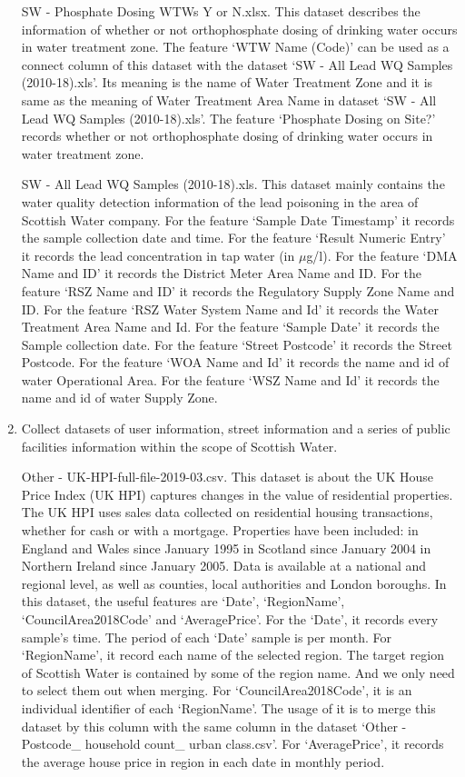 \documentclass[11pt,twoside]{article}
\numberwithin{Theorem}{section}
\numberwithin{Definition}{section}
\numberwithin{Lemma}{section}
\numberwithin{Algorithm}{section}
\numberwithin{equation}{section}
\begin{document}
\begin{enumerate}
SW - Phosphate Dosing WTWs Y or N.xlsx. This dataset describes the information of whether or not orthophosphate dosing of drinking water occurs in water treatment zone. The feature `WTW Name (Code)' can be used as a connect column of this dataset with the dataset `SW - All Lead WQ Samples (2010-18).xls'. Its meaning is the name of Water Treatment Zone and it is same as the meaning of Water Treatment Area Name in dataset `SW - All Lead WQ Samples (2010-18).xls'. The feature `Phosphate Dosing on Site?' records whether or not orthophosphate dosing of drinking water occurs in water treatment zone.

SW - All Lead WQ Samples (2010-18).xls. This dataset mainly contains the water quality detection information of the lead poisoning in the area of Scottish Water company. For the feature `Sample Date Timestamp' it records the sample collection date and time. For the feature `Result Numeric Entry' it records the lead concentration in tap water (in $\mu$g/l). For the feature `DMA Name and ID' it records the District Meter Area Name and ID. For the feature `RSZ Name and ID' it records the Regulatory Supply Zone Name and ID. For the feature `RSZ Water System Name and Id' it records the Water Treatment Area Name and Id. For the feature `Sample Date' it records the Sample collection date. For the feature `Street Postcode' it records the Street Postcode. For the feature `WOA Name and Id' it records the name and id of water Operational Area. For the feature `WSZ Name and Id' it records the name and id of water Supply Zone.

\item Collect datasets of user information, street information and a series of public facilities information within the scope of Scottish Water.

Other - UK-HPI-full-file-2019-03.csv. This dataset is about the UK House Price Index (UK HPI) captures changes in the value of residential properties. The UK HPI uses sales data collected on residential housing transactions, whether for cash or with a mortgage. Properties have been included: in England and Wales since January 1995 in Scotland since January 2004 in Northern Ireland since January 2005. Data is available at a national and regional level, as well as counties, local authorities and London boroughs. In this dataset, the useful features are `Date', `RegionName', `CouncilArea2018Code' and `AveragePrice'. For the `Date', it records every sample's time. The period of each `Date' sample is per month. For `RegionName', it record each name of the selected region. The target region of Scottish Water is contained by some of the region name. And we only need to select them out when merging. For `CouncilArea2018Code', it is an individual identifier of each `RegionName'. The usage of it is to merge this dataset by this column with the same column in the dataset `Other - Postcode\_ household count\_ urban class.csv'. For `AveragePrice', it records the average house price in region in each date in monthly period.


\end{enumerate}
\end{document}
